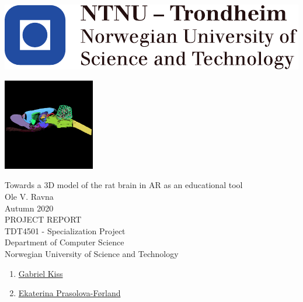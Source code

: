 
\thispagestyle{empty}
\includegraphics[scale=1.1]{fig/NTNU}
\mbox{}\\[3pc]
\begin{center}

\includegraphics[width=0.3\textwidth]{fig/nevrolens_icon}

\Huge{Towards a 3D model of the rat brain in AR as an educational tool}\\[2pc]

\Large{Ole V. Ravna}\\[1pc]
\large{Autumn 2020}\\[2pc]

PROJECT REPORT\\
TDT4501 - Specialization Project\\
Department of Computer Science\\
Norwegian University of Science and Technology
\end{center}
\vfill


\begin{enumerate}[label={Supervisor \arabic*:}]
    \item \href{https://www.ntnu.no/ansatte/gabriel.kiss}{Gabriel Kiss}
    \item \href{https://www.ntnu.no/ansatte/ekaterip}{Ekaterina Prasolova-Førland}
\end{enumerate}


